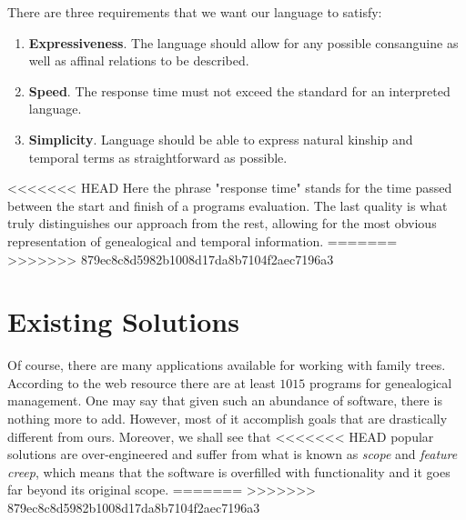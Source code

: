     There are three requirements that we want our language to satisfy:
    \begin{enumerate}
        \item{\textbf{Expressiveness}. The language should allow for any possible consanguine as well as affinal relations to be
            described.}
        \item{\textbf{Speed}. The response time must not exceed the standard for an interpreted language.}
        \item{\textbf{Simplicity}. Language should be able to express natural kinship and temporal terms as straightforward as possible.}
    \end{enumerate}
<<<<<<< HEAD
    Here the phrase "response time" stands for the time passed between the start and finish of a programs evaluation.
    The last quality is what truly distinguishes our approach from the rest, allowing for the most obvious representation of
    genealogical and temporal information.
=======
>>>>>>> 879ec8c8d5982b1008d17da8b7104f2aec7196a3

\section{Existing Solutions}
    Of course, there are many applications available for working with family trees. According to the web resource\cite{gensoft} there
    are at least $1015$ programs for genealogical management. One may say that given such an abundance of software, there is
    nothing more to add. However, most of it accomplish goals that are drastically different from ours. Moreover, we shall see that
<<<<<<< HEAD
    popular solutions are over-engineered and suffer from what is known as \textit{scope} and \textit{feature creep}, which means
    that the software is overfilled with functionality and it goes far beyond its original scope.
=======
>>>>>>> 879ec8c8d5982b1008d17da8b7104f2aec7196a3

